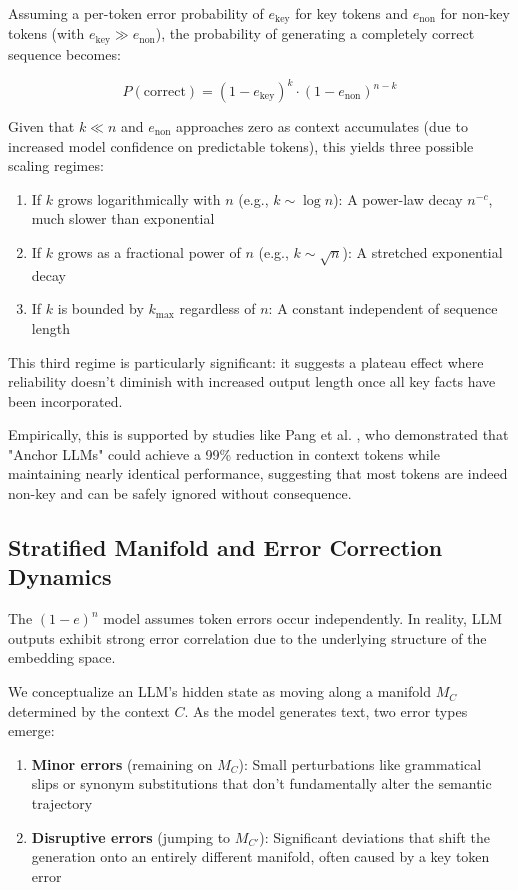 \documentclass{article}
\begin{document}
Assuming a per-token error probability of $e_{\text{key}}$ for key tokens and $e_{\text{non}}$ for non-key tokens (with $e_{\text{key}} \gg e_{\text{non}}$), the probability of generating a completely correct sequence becomes:

\begin{equation}
P(\text{correct}) = (1-e_{\text{key}})^k \cdot (1-e_{\text{non}})^{n-k}
\end{equation}

Given that $k \ll n$ and $e_{\text{non}}$ approaches zero as context accumulates (due to increased model confidence on predictable tokens), this yields three possible scaling regimes:

\begin{enumerate}
\item If $k$ grows logarithmically with $n$ (e.g., $k \sim \log n$): A power-law decay $n^{-c}$, much slower than exponential
\item If $k$ grows as a fractional power of $n$ (e.g., $k \sim \sqrt{n}$): A stretched exponential decay
\item If $k$ is bounded by $k_{\max}$ regardless of $n$: A constant independent of sequence length
\end{enumerate}

This third regime is particularly significant: it suggests a plateau effect where reliability doesn't diminish with increased output length once all key facts have been incorporated.

Empirically, this is supported by studies like Pang et al. \citep{pang2024anchor}, who demonstrated that "Anchor LLMs" could achieve a 99\% reduction in context tokens while maintaining nearly identical performance, suggesting that most tokens are indeed non-key and can be safely ignored without consequence.

\subsection{Stratified Manifold and Error Correction Dynamics}

The $(1-e)^n$ model assumes token errors occur independently. In reality, LLM outputs exhibit strong error correlation due to the underlying structure of the embedding space.

We conceptualize an LLM's hidden state as moving along a manifold $M_C$ determined by the context $C$. As the model generates text, two error types emerge:

\begin{enumerate}
\item \textbf{Minor errors} (remaining on $M_C$): Small perturbations like grammatical slips or synonym substitutions that don't fundamentally alter the semantic trajectory
\item \textbf{Disruptive errors} (jumping to $M_{C'}$): Significant deviations that shift the generation onto an entirely different manifold, often caused by a key token error
\end{enumerate}
\end{document}
